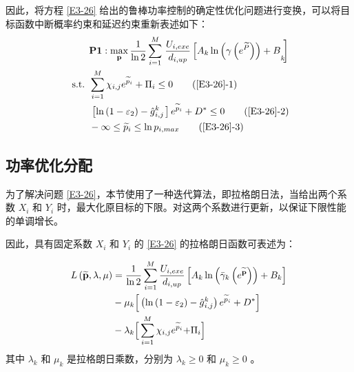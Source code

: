 因此，将方程 \eqref{E3-26} 给出的鲁棒功率控制的确定性优化问题进行变换，可以将目标函数中断概率约束和延迟约束重新表述如下：
\begin{align}
&\textbf{P1}:\max\limits_{\mathbf{p}}\frac{1}{\ln{2}}\sum_{i=1}^{M}\left.\frac{U_{i,exe}}{d_{i,up}}
\left[{A_k\ln{\left(\gamma\left(e^{\widetilde{P}}\right)\right)}+B}_k\!\!\right.\right]                                  \label{E3-26}\\
\text { s.t. }
& \sum_{i=1}^{M}{\chi_{i,j}e^{{\widetilde{p}}_i}}+\mathrm{\Pi}_i\le0                                                     \tag{\ref{E3-26}{-1}}  \label{E3-26-1}\\  %
& \left.\left[\ln\left(1-\varepsilon_2\right)-{\hat{g}}\phantom{}_{i,j}^k\right.\right]e^{{\widetilde{p}}_i}+D^\ast\le0  \tag{\ref{E3-26}{-2}}  \label{E3-26-2}\\  %
& -\infty\le{\widetilde{p}}_i\le \ln{p_{i,max}}                                                                          \tag{\ref{E3-26}{-3}}  \label{E3-26-3}  %
\end{align}
\subsection{功率优化分配}\label{section3-3-3}
为了解决问题 \eqref{E3-26}，本节使用了一种迭代算法，即拉格朗日法，当给出两个系数 $X_i$ 和 $Y_i$ 时，最大化原目标的下限。对这两个系数进行更新，以保证下限性能的单调增长。

因此，具有固定系数 $X_i$ 和 $Y_i$ 的 \eqref{E3-26} 的拉格朗日函数可表述为：

\begin{align}\label{E27}
L\left(\widetilde{\mathbf{p}},\lambda,\mu\right)&=\frac{1}{\ln{2}}\sum_{i=1}^{M}{\frac{U_{i,exe}}{d_{i,up}}\left[A_k\ln{\left({\bar{\gamma}}_k\left(e^{\widetilde{\mathbf{p}}}\right)\right)}+B_k\right]}\\
&\notag-\mu_k\Big[\left(\ln\left(1-\varepsilon_2\right)-{\hat{g}}\phantom{}_{i,j}^k\right)e^{{\widetilde{p}}_i}+D^\ast\Big]\\
&-\lambda_k\Big[\sum_{i=1}^{M}{\chi_{i,j}e^{{\widetilde{p}}_i}}{+\mathrm{\Pi}}_i\Big]\notag
\end{align}
其中 $\lambda_k$ 和 $\mu_k$ 是拉格朗日乘数，分别为 $\lambda_k\geq0$ 和 $\mu_k\geq0$ 。

